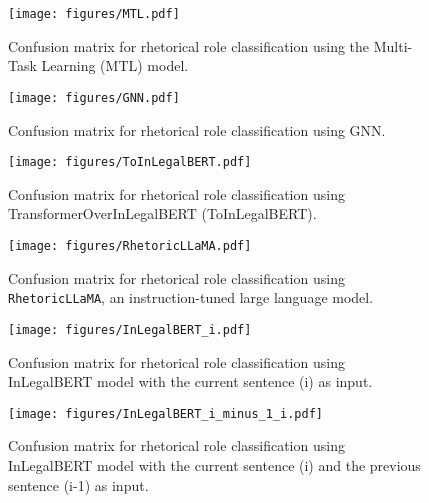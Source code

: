 \begin{figure}[ht]
    \centering
    \texttt{[image: figures/MTL.pdf]}
    \caption{Confusion matrix for rhetorical role classification using the Multi-Task Learning (MTL) model.}
\label{fig:mtl}

\end{figure}

\begin{figure}[ht]
    \centering
    \texttt{[image: figures/GNN.pdf]}
    \caption{Confusion matrix for rhetorical role classification using GNN.}
\label{fig:gnn}
\end{figure}


\begin{figure}[ht]
    \centering
    \texttt{[image: figures/ToInLegalBERT.pdf]}
    \caption{Confusion matrix for rhetorical role classification using TransformerOverInLegalBERT (ToInLegalBERT).}
\label{fig:toinlegalbert}
\end{figure}

\begin{figure}[ht]
    \centering
    \texttt{[image: figures/RhetoricLLaMA.pdf]}
    \caption{Confusion matrix for rhetorical role classification using \texttt{RhetoricLLaMA}, an instruction-tuned large language model.}
\label{fig:rhetoricllama}
\end{figure}

\begin{figure}[ht]
    \centering
    \texttt{[image: figures/InLegalBERT\_i.pdf]}
    \caption{Confusion matrix for rhetorical role classification using InLegalBERT model with the current sentence (i) as input.}
    \label{fig:inlegalbert_i}
\end{figure}

\begin{figure}[ht]
    \centering
    \texttt{[image: figures/InLegalBERT\_i\_minus\_1\_i.pdf]}
    \caption{Confusion matrix for rhetorical role classification using InLegalBERT model with the current sentence (i) and the previous sentence (i-1) as input.}
\label{fig:inlegalbert_i-1_i}

\end{figure}

